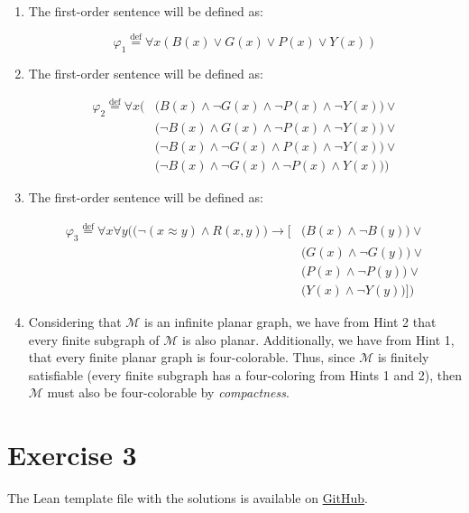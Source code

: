 \documentclass[11pt]{article}
\newcommand*{\defeq}{\stackrel{\text{def}}{=}}
\begin{document}
\begin{enumerate}
    \item The first-order sentence will be defined as:
    
    $$\varphi_1 \defeq \forall x (B(x) \lor G(x) \lor P(x) \lor Y(x))$$
    
    \item The first-order sentence will be defined as:
    
    \begin{align*}
        \varphi_2 \defeq \forall x \Big( & \big(B(x) \land \lnot G(x) \land \lnot P(x) \land \lnot Y(x)\big) \lor \\
          & \big(\lnot B(x) \land G(x) \land \lnot P(x) \land \lnot Y(x)\big) \lor\\
          &\big(\lnot B(x) \land \lnot G(x) \land P(x) \land \lnot Y(x)\big) \lor \\
          &\big(\lnot B(x) \land \lnot G(x) \land \lnot P(x) \land Y(x)\big)\Big)
    \end{align*}

    \item The first-order sentence will be defined as:
    
    \begin{align*}
        \varphi_3 \defeq \forall x \forall y \Big( \big(\lnot (x \approx y) \land R(x, y)\big) \to \big[ & \big(B(x) \land \lnot B(y)\big) \lor \\
        & \big(G(x) \land \lnot G(y)\big) \lor \\
        & \big(P(x) \land \lnot P(y)\big) \lor \\
        & \big(Y(x) \land \lnot Y(y)\big)\big]\Big)
    \end{align*}
    
    \item Considering that $\mathcal{M}$ is an infinite planar graph, we have from Hint 2 that every finite subgraph of $\mathcal{M}$ is also planar. Additionally, we have from Hint 1, that every finite planar graph is four-colorable. Thus, since $\mathcal{M}$ is finitely satisfiable (every finite subgraph has a four-coloring from Hints 1 and 2), then $\mathcal{M}$ must also be four-colorable by \textit{compactness}. 
\end{enumerate}


\section*{Exercise 3}
The Lean template file with the solutions is available on \href{https://github.com/lucastassis/BU-CS511/blob/main/HW10/code/HW10.lean}{GitHub}.
\end{document}
